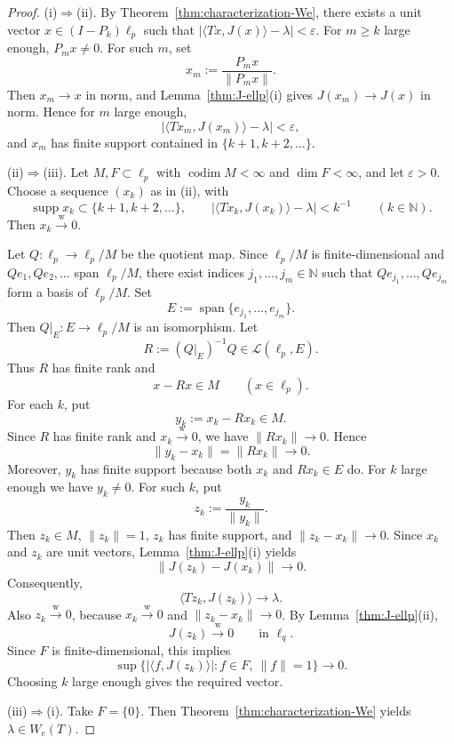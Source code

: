 \documentclass[11pt]{amsart}
\numberwithin{equation}{section}
\theoremstyle{definition}
\theoremstyle{remark}
\DeclareMathOperator{\codim}{codim}
\DeclareMathOperator{\supp}{supp}
\newcommand{\N}{\mathbb{N}}
\newcommand{\ip}[2]{\langle #1,#2\rangle}
\newcommand{\We}{W_e}
\newcommand{\wto}{\xrightarrow{\mathrm w}}
\begin{document}
\begin{proof}
\textup{(i)$\Rightarrow$(ii).} By
Theorem~\ref{thm:characterization-We}, there exists a unit vector $x\in (I-P_k)\ell_p$ such that $|\ip{Tx}{J(x)}-\lambda|<\varepsilon$.
For $m\ge k$ large enough, $P_mx\ne 0$. For such $m$, set
\[
x_m:=\frac{P_mx}{\|P_mx\|}.
\]
Then $x_m\to x$ in norm, and Lemma~\ref{thm:J-ellp}(i) gives $J(x_m)\to J(x)$ in norm. Hence for $m$ large enough,
\[
|\ip{Tx_m}{J(x_m)}-\lambda|<\varepsilon,
\]
and $x_m$ has finite support contained in $\{k+1,k+2,\dots\}$.

\smallskip

\textup{(ii)$\Rightarrow$(iii).} Let $M,F\subset \ell_p$ with $\codim M<\infty$ and $\dim F<\infty$, and let $\varepsilon>0$.
Choose a sequence $(x_k)$ as in \textup{(ii)}, with
\[
\supp x_k\subset\{k+1,k+2,\dots\},
\qquad
|\ip{Tx_k}{J(x_k)}-\lambda|<k^{-1}
\qquad (k\in\N).
\]
Then $x_k\wto 0$.

Let $Q:\ell_p\to \ell_p/M$ be the quotient map. Since $\ell_p/M$ is finite-dimensional and $Qe_1,Qe_2,\dots$ span $\ell_p/M$, there exist indices $j_1,\dots,j_m\in\N$ such that $Qe_{j_1},\dots,Qe_{j_m}$ form a basis of $\ell_p/M$. Set
\[
E:=\operatorname{span}\{e_{j_1},\dots,e_{j_m}\}.
\]
Then $Q|_E:E\to \ell_p/M$ is an isomorphism. Let
\[
R:=(Q|_E)^{-1}Q\in \mathcal L(\ell_p,E).
\]
Thus $R$ has finite rank and
\[
x-Rx\in M
\qquad (x\in\ell_p).
\]
For each $k$, put
\[
y_k:=x_k-Rx_k\in M.
\]
Since $R$ has finite rank and $x_k\wto 0$, we have $\|Rx_k\|\to 0$. Hence
\[
\|y_k-x_k\|=\|Rx_k\|\to 0.
\]
Moreover, $y_k$ has finite support because both $x_k$ and $Rx_k\in E$ do. For $k$ large enough we have $y_k\ne 0$. For such $k$, put
\[
z_k:=\frac{y_k}{\|y_k\|}.
\]
Then $z_k\in M$, $\|z_k\|=1$, $z_k$ has finite support, and $\|z_k-x_k\|\to 0$. Since $x_k$ and $z_k$ are unit vectors, Lemma~\ref{thm:J-ellp}(i) yields
\[
\|J(z_k)-J(x_k)\|\to 0.
\]
Consequently,
\[
\ip{Tz_k}{J(z_k)}\to \lambda.
\]
Also $z_k\wto 0$, because $x_k\wto 0$ and $\|z_k-x_k\|\to 0$. By Lemma~\ref{thm:J-ellp}(ii),
\[
J(z_k)\wto 0
\qquad\text{in }\ell_q.
\]
Since $F$ is finite-dimensional, this implies
\[
\sup\{|\ip{f}{J(z_k)}|: f\in F,\ \|f\|=1\}\to 0.
\]
Choosing $k$ large enough gives the required vector.

\smallskip

\textup{(iii)$\Rightarrow$(i).} Take $F=\{0\}$. Then Theorem~\ref{thm:characterization-We} yields $\lambda\in \We(T)$.
\end{proof}
\end{document}

